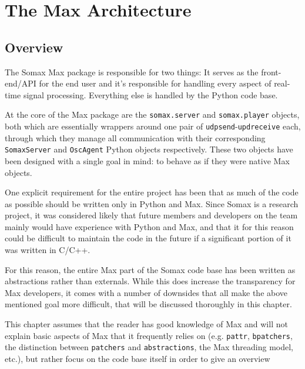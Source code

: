 \chapter{The Max Architecture}\label{sec:3-max-architecture}


\section{Overview}\label{ssec:3-overview}
The Somax Max package is responsible for two things: It serves as the front-end/API for the end user and it's responsible for handling every aspect of real-time signal processing. Everything else is handled by the Python code base. 

At the core of the Max package are the \texttt{somax.server} and \texttt{somax.player} objects, both which are essentially wrappers around one pair of \texttt{udpsend}-\texttt{updreceive} each, through which they manage all communication with their corresponding \texttt{SomaxServer} and \texttt{OscAgent} Python objects respectively. These two objects have been designed with a single goal in mind: to behave as if they were native Max objects.

One explicit requirement for the entire project has been that as much of the code as possible should be written only in Python and Max. Since Somax is a research project, it was considered likely that future members and developers on the team mainly would have experience with Python and Max, and that it for this reason could  be difficult to maintain the code in the future if a significant portion of it was written in C/C++.

For this reason, the entire Max part of the Somax code base has been written as abstractions rather than externals. While this does increase the transparency for Max developers, it comes with a number of downsides that all make the above mentioned goal more difficult, that will be discussed thoroughly in this chapter. 

This chapter assumes that the reader has good knowledge of Max and will not explain basic aspects of Max that it frequently relies on (e.g. \texttt{pattr}, \texttt{bpatchers}, the distinction between \texttt{patchers} and \texttt{abstractions}, the Max threading model, etc.), but rather focus on the code base itself in order to give an overview

